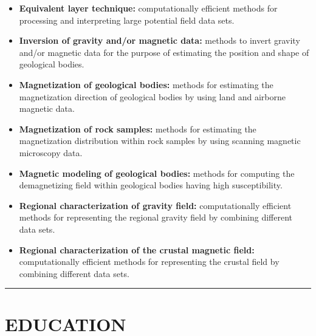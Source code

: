 \documentclass[11pt,a4paper,onecolumn]{article}
\begin{document}
\begin{itemize}[leftmargin=*]

\item{\textbf{Equivalent layer technique:} computationally efficient methods for processing and interpreting large potential field data sets.}

\item{\textbf{Inversion of gravity and/or magnetic data:} methods to invert gravity and/or magnetic data for the purpose of estimating the position and shape of geological bodies.}

\item{\textbf{Magnetization of geological bodies:} methods for estimating the magnetization direction of geological bodies by using land and airborne magnetic data.}

\item{\textbf{Magnetization of rock samples:} methods for estimating the magnetization distribution within rock samples by using scanning magnetic microscopy data.}

\item{\textbf{Magnetic modeling of geological bodies:} methods for computing the demagnetizing field within geological bodies having high susceptibility.}

\item{\textbf{Regional characterization of gravity field:} computationally efficient methods for representing the regional gravity field by combining different data sets.}

\item{\textbf{Regional characterization of the crustal magnetic field:} computationally efficient methods for representing the crustal field by combining different data sets.}
		
\end{itemize}

\bigskip \hrule

\section*{EDUCATION}

\medskip
\end{document}
